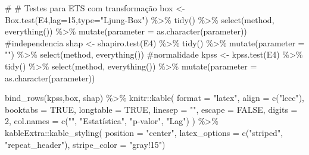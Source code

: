 \documentclass[
  letterpaper,
  DIV=11,
  numbers=noendperiod]{scrartcl}
\newenvironment{Shaded}{\begin{snugshade}}{\end{snugshade}}
\newcommand{\AttributeTok}[1]{\textcolor[rgb]{0.40,0.45,0.13}{#1}}
\newcommand{\CommentTok}[1]{\textcolor[rgb]{0.37,0.37,0.37}{#1}}
\newcommand{\ConstantTok}[1]{\textcolor[rgb]{0.56,0.35,0.01}{#1}}
\newcommand{\DecValTok}[1]{\textcolor[rgb]{0.68,0.00,0.00}{#1}}
\newcommand{\FunctionTok}[1]{\textcolor[rgb]{0.28,0.35,0.67}{#1}}
\newcommand{\NormalTok}[1]{\textcolor[rgb]{0.00,0.23,0.31}{#1}}
\newcommand{\OtherTok}[1]{\textcolor[rgb]{0.00,0.23,0.31}{#1}}
\newcommand{\SpecialCharTok}[1]{\textcolor[rgb]{0.37,0.37,0.37}{#1}}
\newcommand{\StringTok}[1]{\textcolor[rgb]{0.13,0.47,0.30}{#1}}
\begin{document}
\begin{Shaded}
\begin{Highlighting}[]
\CommentTok{\# \# Testes para ETS com transformação}
\NormalTok{box }\OtherTok{\textless{}{-}} \FunctionTok{Box.test}\NormalTok{(E4,}\AttributeTok{lag=}\DecValTok{15}\NormalTok{,}\AttributeTok{type=}\StringTok{"Ljung{-}Box"}\NormalTok{) }\SpecialCharTok{\%\textgreater{}\%} \FunctionTok{tidy}\NormalTok{() }\SpecialCharTok{\%\textgreater{}\%} \FunctionTok{select}\NormalTok{(method, }\FunctionTok{everything}\NormalTok{()) }\SpecialCharTok{\%\textgreater{}\%} \FunctionTok{mutate}\NormalTok{(}\AttributeTok{parameter =} \FunctionTok{as.character}\NormalTok{(parameter)) }\CommentTok{\#independencia}
\NormalTok{shap }\OtherTok{\textless{}{-}} \FunctionTok{shapiro.test}\NormalTok{(E4) }\SpecialCharTok{\%\textgreater{}\%} \FunctionTok{tidy}\NormalTok{() }\SpecialCharTok{\%\textgreater{}\%} \FunctionTok{mutate}\NormalTok{(}\AttributeTok{parameter =} \StringTok{""}\NormalTok{) }\SpecialCharTok{\%\textgreater{}\%} \FunctionTok{select}\NormalTok{(method, }\FunctionTok{everything}\NormalTok{())  }\CommentTok{\#normalidade}
\NormalTok{kpss }\OtherTok{\textless{}{-}} \FunctionTok{kpss.test}\NormalTok{(E4) }\SpecialCharTok{\%\textgreater{}\%} \FunctionTok{tidy}\NormalTok{() }\SpecialCharTok{\%\textgreater{}\%} \FunctionTok{select}\NormalTok{(method, }\FunctionTok{everything}\NormalTok{()) }\SpecialCharTok{\%\textgreater{}\%} \FunctionTok{mutate}\NormalTok{(}\AttributeTok{parameter =} \FunctionTok{as.character}\NormalTok{(parameter))}

\FunctionTok{bind\_rows}\NormalTok{(kpss,box, shap) }\SpecialCharTok{\%\textgreater{}\%}
\NormalTok{  knitr}\SpecialCharTok{::}\FunctionTok{kable}\NormalTok{(}
    \AttributeTok{format =} \StringTok{"latex"}\NormalTok{,}
    \AttributeTok{align =} \FunctionTok{c}\NormalTok{(}\StringTok{"lccc"}\NormalTok{),}
    \AttributeTok{booktabs =} \ConstantTok{TRUE}\NormalTok{,}
    \AttributeTok{longtable =} \ConstantTok{TRUE}\NormalTok{,}
    \AttributeTok{linesep =} \StringTok{""}\NormalTok{,}
    \AttributeTok{escape =} \ConstantTok{FALSE}\NormalTok{,}
    \AttributeTok{digits =} \DecValTok{2}\NormalTok{,}
    \AttributeTok{col.names =} \FunctionTok{c}\NormalTok{(}\StringTok{""}\NormalTok{, }\StringTok{"Estatística"}\NormalTok{, }\StringTok{"p{-}valor"}\NormalTok{, }\StringTok{"Lag"}\NormalTok{)}
\NormalTok{    ) }\SpecialCharTok{\%\textgreater{}\%}
\NormalTok{  kableExtra}\SpecialCharTok{::}\FunctionTok{kable\_styling}\NormalTok{(}
      \AttributeTok{position =} \StringTok{"center"}\NormalTok{,}
      \AttributeTok{latex\_options =} \FunctionTok{c}\NormalTok{(}\StringTok{"striped"}\NormalTok{, }\StringTok{"repeat\_header"}\NormalTok{),}
      \AttributeTok{stripe\_color =} \StringTok{"gray!15"}\NormalTok{)}


\end{Highlighting}
\end{Shaded}
\end{document}

